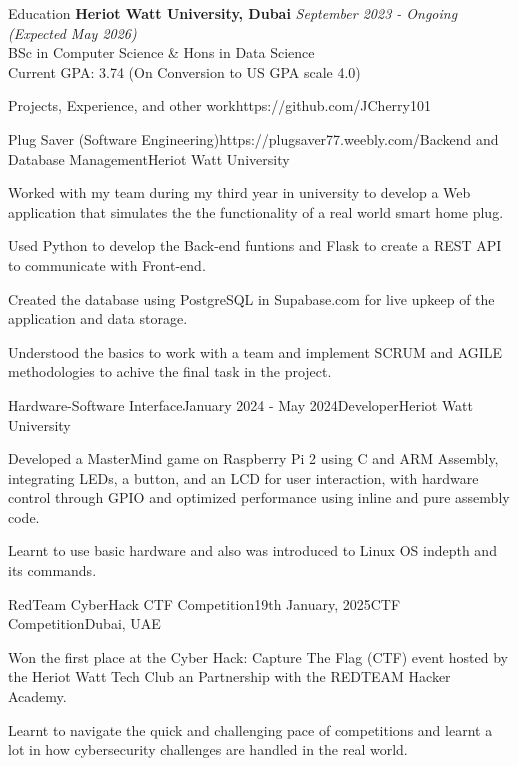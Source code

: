 \documentclass{resume}
\begin{document}
  \begin{rSection}{Education}
    {\bf Heriot Watt University, Dubai} \hfill {\em September 2023 - Ongoing (Expected May 2026)} \\ 
    { BSc in Computer Science \& Hons in Data Science} \smallskip \\
    Current GPA: 3.74 (On Conversion to US GPA scale 4.0)
  \end{rSection}
  
  \begin{rSection}{Projects, Experience, and other work}{https://github.com/JCherry101}
  
    \begin{rSubsection}{Plug Saver (Software Engineering)}{https://plugsaver77.weebly.com/}{Backend and Database Management}{Heriot Watt University}
    \item Worked with my team during my third year in university to develop a Web application that simulates the the functionality of a real world smart home plug.
    \item Used Python to develop the Back-end funtions and Flask to create a REST API to communicate with Front-end.
    \item Created the database using PostgreSQL in Supabase.com for live upkeep of the application and data storage.
    \item Understood the basics to work with a team and implement SCRUM and AGILE methodologies to achive the final task in the project.
    \end{rSubsection}
  
    \begin{rSubsection}{Hardware-Software Interface}{January 2024 - May 2024}{Developer}{Heriot Watt University}
    \item Developed a MasterMind game on Raspberry Pi 2 using C and ARM Assembly, integrating LEDs, a button, and an LCD for user interaction, with hardware control through GPIO and optimized performance using inline and pure assembly code.
    \item Learnt to use basic hardware and also was introduced to Linux OS indepth and its commands.
    \end{rSubsection}

    \begin{rSubsection}{RedTeam CyberHack CTF Competition}{19th January, 2025}{CTF Competition}{Dubai, UAE}
    \item Won the first place at the Cyber Hack: Capture The Flag (CTF) event hosted by the Heriot Watt Tech Club an Partnership with the REDTEAM Hacker Academy.
    \item Learnt to navigate the quick and challenging pace of competitions and learnt a lot in how cybersecurity challenges are handled in the real world.
    \end{rSubsection}


\end{rSection}
\end{document}
